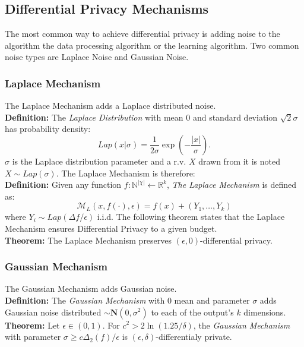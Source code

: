 \subsection{Differential Privacy Mechanisms}
The most common way to achieve differential privacy is adding noise to the algorithm the data processing algorithm or the learning algorithm. Two common noise types are Laplace Noise and Gaussian Noise.
\subsubsection{Laplace Mechanism}
The Laplace Mechanism adds a Laplace distributed noise. \\
\textbf{Definition:} The \textit{Laplace Distribution} with mean 0 and standard deviation $\sqrt{2} \sigma$ has probability density:
$$ Lap(x|\sigma)=\frac{1}{2\sigma}\exp \left (- \frac{|x|}{\sigma} \right ).$$ $\sigma$ is the Laplace distribution parameter and a r.v. $X$ drawn from it is noted $X \sim Lap(\sigma)$.
The Laplace Mechanism is therefore: \\
\textbf{Definition:} Given any function $f:\mathbb{N}^{|\chi|} \leftarrow \mathbb{R}^{k}$, \textit{The Laplace Mechanism} is defined as:
$$ \mathcal{M}_{L}(x,f(\cdot), \epsilon) = f(x)+(Y_{1},\ldots ,Y_{k})$$
where $Y_{i} \sim Lap(\Delta f / \epsilon)$ i.i.d.
The following theorem states that the Laplace Mechanism ensures Differential Privacy to a given budget. \\
\textbf{Theorem:} The Laplace Mechanism preserves $(\epsilon, 0)$-differential privacy.
\subsubsection{Gaussian Mechanism}
The Gaussian Mechanism adds Gaussian noise. \\
\textbf{Definition:} The \textit{Gaussian Mechanism} with 0 mean and parameter $\sigma$ adds Gaussian noise distributed $\sim \mathbf{N}(0,\sigma^{2})$ to each of the output's $k$ dimensions.\\
\textbf{Theorem:} Let $\epsilon \in (0,1)$. For $c^{2} > 2 \ln(1.25/\delta)$, the \textit{Gaussian Mechanism} with parameter $\sigma \geq c\Delta_{2}(f)/\epsilon$ is $(\epsilon, \delta)$-differentialy private.




